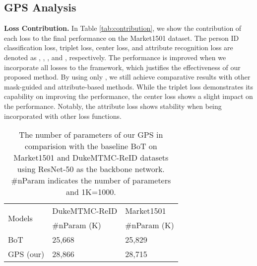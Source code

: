 \documentclass[final]{cvpr}
\begin{document}
\subsection{GPS Analysis}


\textbf{Loss Contribution.}  In Table \ref{tab:contribution}, we show the contribution of each loss to the final performance on the Market1501 dataset. The person ID classification loss, triplet loss, center loss, and attribute recognition loss are denoted as , , , and , respectively. The performance is improved when we incorporate all losses to the framework, which justifies the effectiveness of our proposed method. By using only , we still achieve comparative results with other mask-guided and attribute-based methods. While the triplet loss  demonstrates its capability on improving the performance, the center loss  shows a slight impact on the performance. Notably, the attribute loss  shows stability when being incorporated with other loss functions.


\begin{table*}
\centering
\caption{The number of parameters of our GPS in comparision with the baseline BoT \cite{BoT} on Market1501 and DukeMTMC-ReID datasets using ResNet-50 \cite{resnet} as the backbone network. \#nParam indicates the number of parameters and 1K=1000.}
\label{tab:nParam}
\begin{tabular}{p{3.5cm} | p{3.0cm} | p{3.0cm}}
\hline
\multirow{2}{*}{Models}     &DukeMTMC-ReID &Market1501     \\
\cline{2-3}
                            &\#nParam (K)  &\#nParam (K)     \\
\hline
\hline
BoT \cite{BoT}              &25,668        &25,829       \\
GPS (our)                   &28,866        &28,715        \\
\hline
\end{tabular}
\end{table*}
\end{document}
